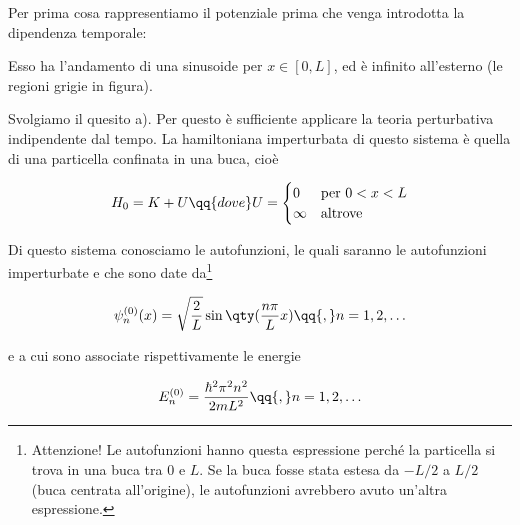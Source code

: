 \begin{soluzione}
   Per prima cosa rappresentiamo il potenziale prima che venga introdotta la dipendenza temporale:
   \begin{figure}[H]
      \centering
   \end{figure}
   Esso ha l'andamento di una sinusoide per $x \in [0,L]$, ed è infinito all'esterno (le regioni grigie in figura).

   Svolgiamo il quesito a). Per questo è sufficiente applicare la teoria perturbativa indipendente dal tempo. La hamiltoniana imperturbata di questo sistema è quella di una particella confinata in una buca, cioè
   
   \begin{equation*}
      H_0=K + U
      \qq{dove}
      U=
      \begin{cases}
         0 & \text{per } 0 < x < L\\
         \infty & \text{altrove}\\
      \end{cases}
   \end{equation*}
   
   Di questo sistema conosciamo le autofunzioni, le quali saranno le autofunzioni imperturbate e che sono date da\footnote{Attenzione! Le autofunzioni hanno questa espressione perché la particella si trova in una buca tra $0$ e $L$. Se la buca fosse stata estesa da $-L/2$ a $L/2$ (buca centrata all'origine), le autofunzioni avrebbero avuto un'altra espressione.}
   
   \begin{equation*}
      \psi_n^{(0)}(x)
      =\sqrt{\frac{2}{L}} \sin{\qty( \frac{n \pi}{L} x)}
      \qq{,}
      n=1,2,\ldots
   \end{equation*}

   e a cui sono associate rispettivamente le energie

   \begin{equation*}
      E_n^{(0)}
      =\frac{\hbar^2 \pi^2 n^2}{2mL^2}
      \qq{,}
      n=1,2,\ldots
   \end{equation*}


\end{soluzione}
